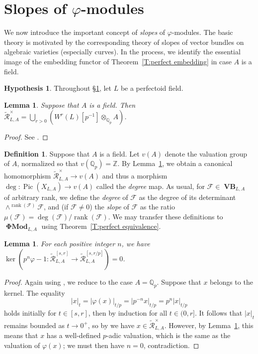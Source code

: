 \documentclass[12pt]{amsart}
\newtheorem{lemma}[theorem]{Lemma}
\theoremstyle{definition}
\newtheorem{defn}[theorem]{Definition}
\newtheorem{hypothesis}[theorem]{Hypothesis}
\numberwithin{equation}{theorem}
\newcommand{\QQ}{\mathbb{Q}}
\newcommand{\ZZ}{\mathbb{Z}}
\newcommand{\calF}{\mathcal{F}}
\newcommand{\calR}{\mathcal{R}}
\DeclareMathOperator{\PhiMod}{\mathbf{\Phi Mod}}
\DeclareMathOperator{\Pic}{Pic}
\DeclareMathOperator{\rank}{rank}
\DeclareMathOperator{\VB}{\mathbf{VB}}
\begin{document}
\section{Slopes of \texorpdfstring{$\varphi$}{phi}-modules}
\label{sec:slopes}

We now introduce the important concept of \emph{slopes} of $\varphi$-modules. The basic theory is motivated by the corresponding theory of slopes of vector bundles on algebraic varieties (especially curves). In the process, we identify the essential image of the embedding functor of Theorem~\ref{T:perfect embedding} in case $A$ is a field.

\begin{hypothesis}
Throughout \S\ref{sec:slopes}, let $L$ be a perfectoid field.
\end{hypothesis}

\begin{lemma} \label{L:units}
Suppose that $A$ is a field.
Then $\tilde{\calR}_{L,A}^{\times} = \bigcup_{r>0} (W^r(L)[p^{-1}] \otimes_{\QQ_p} A)$.
\end{lemma}
\begin{proof}
See \cite[Corollary~4.2.5]{kedlaya-liu1}.
\end{proof}

\begin{defn}
Suppose that $A$ is a field. Let $v(A)$ denote the valuation group of $A$, normalized so that $v(\QQ_p) = \ZZ$. By Lemma~\ref{L:units},
we obtain a canonical homomorphism $\tilde{\calR}_{L,A}^{\times} \to v(A)$
and thus a morphism $\deg: \Pic(X_{L,A}) \to v(A)$ called the \emph{degree} map.
As usual, for $\calF \in \VB_{L,A}$ of arbitrary rank, we define the \emph{degree} of $\calF$ as the degree of its determinant $\wedge^{\rank(\calF)} \calF$, and (if $\calF \neq 0$) the \emph{slope} of $\calF$ as the ratio $\mu(\calF) = \deg(\calF)/\rank(\calF)$.
We may transfer these definitions to $\PhiMod_{L,A}$ using Theorem~\ref{T:perfect equivalence}.
\end{defn}

\begin{lemma} \label{L:no subinvariants}
For each positive integer $n$, we have
$\ker(p^n \varphi-1: \tilde{\calR}^{[s,r]}_{L,A} \to \tilde{\calR}^{[s,r/p]}_{L,A}) = 0$. \end{lemma}
\begin{proof}
Again using \cite[Lemma~2.2.9(b)]{kedlaya-liu1}, we reduce to the case $A = \QQ_p$.
Suppose that $x$ belongs to the kernel. The equality
\[
\left| x \right|_{t} = \left| \varphi(x) \right|_{t/p} = \left| p^{-n} x \right|_{t/p} 
= p^n \left| x \right|_{t/p}
\]
holds initially for $t \in [s, r]$, then by induction for all $t \in (0, r]$.
It follows that $\left| x \right|_t$ remains bounded as $t \to 0^+$, so by 
\cite[Lemma~4.2.4]{kedlaya-liu1} we have $x \in \tilde{\calR}_{L,A}^{\times}$.
However, by Lemma~\ref{L:units}, this means that $x$ has a well-defined $p$-adic valuation, which is the same as the valuation of $\varphi(x)$; we must then have $n=0$, contradiction.
\end{proof}
\end{document}
